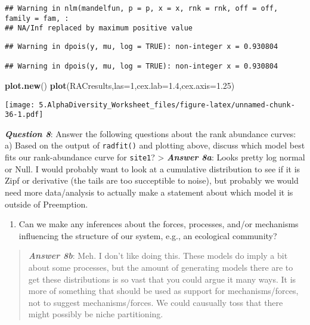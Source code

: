 \documentclass[
]{article}
\newenvironment{Shaded}{\begin{snugshade}}{\end{snugshade}}
\newcommand{\DataTypeTok}[1]{\textcolor[rgb]{0.13,0.29,0.53}{#1}}
\newcommand{\DecValTok}[1]{\textcolor[rgb]{0.00,0.00,0.81}{#1}}
\newcommand{\FloatTok}[1]{\textcolor[rgb]{0.00,0.00,0.81}{#1}}
\newcommand{\KeywordTok}[1]{\textcolor[rgb]{0.13,0.29,0.53}{\textbf{#1}}}
\newcommand{\NormalTok}[1]{#1}
\providecommand{\tightlist}{%
  \setlength{\itemsep}{0pt}\setlength{\parskip}{0pt}}
\begin{document}
\begin{verbatim}
## Warning in nlm(mandelfun, p = p, x = x, rnk = rnk, off = off, family = fam, :
## NA/Inf replaced by maximum positive value
\end{verbatim}

\begin{verbatim}
## Warning in dpois(y, mu, log = TRUE): non-integer x = 0.930804

## Warning in dpois(y, mu, log = TRUE): non-integer x = 0.930804
\end{verbatim}

\begin{Shaded}
\begin{Highlighting}[]
\KeywordTok{plot.new}\NormalTok{()}
\KeywordTok{plot}\NormalTok{(RACresults,}\DataTypeTok{las=}\DecValTok{1}\NormalTok{,}\DataTypeTok{cex.lab=}\FloatTok{1.4}\NormalTok{,}\DataTypeTok{cex.axis=}\FloatTok{1.25}\NormalTok{)}
\end{Highlighting}
\end{Shaded}

\texttt{[image: 5.AlphaDiversity\_Worksheet\_files/figure-latex/unnamed-chunk-36-1.pdf]}

\textbf{\emph{Question 8}}: Answer the following questions about the
rank abundance curves: a) Based on the output of \texttt{radfit()} and
plotting above, discuss which model best fits our rank-abundance curve
for \texttt{site1}? \textgreater{} \textbf{\emph{Answer 8a}}: Looks
pretty log normal or Null. I would probably want to look at a cumulative
distribution to see if it is Zipf or derivative (the tails are too
succeptible to noise), but probably we would need more data/analysis to
actually make a statement about which model it is outside of Preemption.

\begin{enumerate}
\def\labelenumi{\alph{enumi})}
\setcounter{enumi}{1}
\tightlist
\item
  Can we make any inferences about the forces, processes, and/or
  mechanisms influencing the structure of our system, e.g., an
  ecological community?
\end{enumerate}

\begin{quote}
\textbf{\emph{Answer 8b}}: Meh. I don't like doing this. These models do
imply a bit about some processes, but the amount of generating models
there are to get these distributions is so vast that you could argue it
many ways. It is more of something that should be used as support for
mechanisms/forces, not to suggest mechanisms/forces. We could causually
toss that there might possibly be niche partitioning.
\end{quote}
\end{document}
